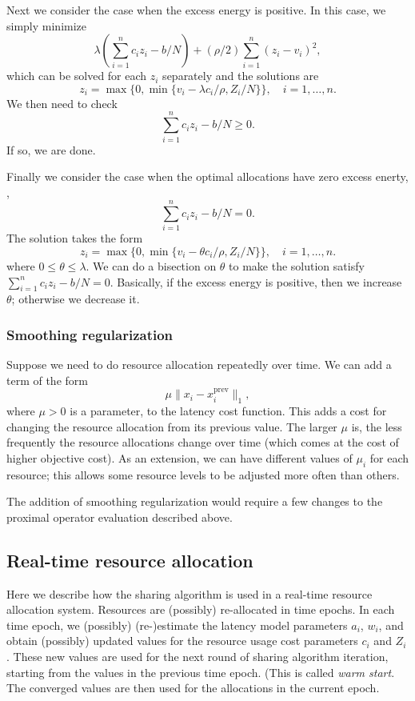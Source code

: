 Next we consider the case when the excess energy is positive.
In this case, we simply minimize
\[
    \lambda \left(\sum_{i=1}^n c_i z_i - b/N \right) 
    + (\rho/2)\sum_{i=1}^n (z_i-v_i)^2,
\]
which can be solved for each $z_i$ separately and the solutions are
\[
    z_i = \max\{0, \min\{v_i - \lambda c_i/\rho, Z_i/N\}\}, \quad i=1,\ldots, n.
\]
We then need to check
\[
    \sum_{i=1}^n c_i z_i - b/N \geq 0.
\]
If so, we are done.

Finally we consider the case when the optimal allocations have zero excess
enerty, \ie,
\[
    \sum_{i=1}^n c_i z_i - b/N = 0.
\]
The solution takes the form
\[
    z_i = \max\{0, \min\{v_i - \theta c_i/\rho, Z_i/N\}\}, \quad i=1,\ldots, n.
\]
where $0\leq\theta\leq\lambda$.
We can do a bisection on $\theta$ to make the solution satisfy
$\sum_{i=1}^n c_i z_i-b/N=0$.
Basically, if the excess energy is positive, then we increase~$\theta$;
otherwise we decrease it.




\subsubsection{Smoothing regularization}

Suppose we need to do resource allocation repeatedly over time.
We can add a term of the form
\[
\mu \| x_i - x_i^\mathrm{prev}\|_1,
\]
where $\mu > 0$ is a parameter, to the latency cost function.
This adds a cost for changing the resource allocation from its
previous value.
The larger $\mu$ is, the less frequently the resource allocations change
over time (which comes at the cost of higher objective cost).
As an extension, we can have different values of $\mu_i$ for each
resource; this allows some resource levels to be adjusted more often than
others.

The addition of smoothing regularization would require a few 
changes to the proximal operator evaluation described above.

\subsection{Real-time resource allocation}

Here we describe how the sharing algorithm is used in a real-time 
resource allocation system.
Resources are (possibly) re-allocated in time epochs.
In each time epoch, we (possibly) 
(re-)estimate the latency model parameters $a_i$, $w_i$, and
obtain (possibly) updated values for the resource usage cost 
parameters $c_i$ and $Z_i$.
These new values are used for the next round of sharing algorithm iteration,
starting from the values in the previous time epoch.  (This is called
\emph{warm start}.
The converged values are then used for the allocations in the 
current epoch.

